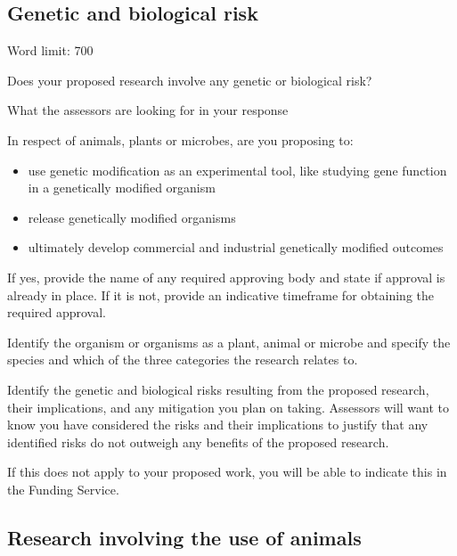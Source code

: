 \documentclass[11pt]{article}
\newenvironment{instruction}{%
    \begin{tcolorbox}[breakable,colback=red!5,colframe=red,title=Instruction]%
	}{%
    	\end{tcolorbox}%
	}
\begin{document}
% 

\pagebreak
\subsection{Genetic and biological risk}

\begin{instruction}

Word limit: 700

Does your proposed research involve any genetic or biological risk?

What the assessors are looking for in your response

In respect of animals, plants or microbes, are you proposing to:

\begin{itemize}

	\item use genetic modification as an experimental tool, like studying gene
function in a genetically modified organism

	\item release genetically modified organisms

	\item ultimately develop commercial and industrial genetically modified
outcomes

\end{itemize}

If yes, provide the name of any required approving body and state if approval
is already in place. If it is not, provide an indicative timeframe for
obtaining the required approval.

Identify the organism or organisms as a plant, animal or microbe and specify
the species and which of the three categories the research relates to.

Identify the genetic and biological risks resulting from the proposed research,
their implications, and any mitigation you plan on taking. Assessors will want
to know you have considered the risks and their implications to justify that
any identified risks do not outweigh any benefits of the proposed research.

If this does not apply to your proposed work, you will be able to indicate this
in the Funding Service.

\end{instruction}

\pagebreak
\subsection{Research involving the use of animals}
\end{document}
